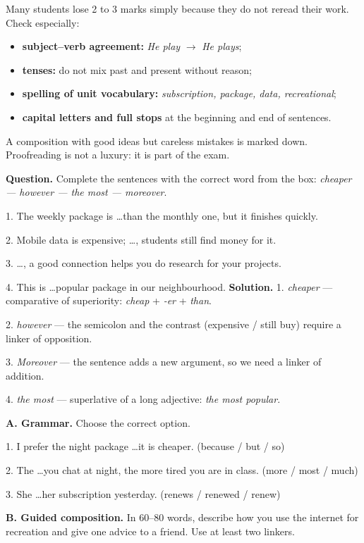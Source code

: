 \documentclass[11pt]{article}
\begin{document}
\begin{attention}
Many students lose 2 to 3 marks simply because they do not reread their work. Check especially:
\begin{itemize}
\item \textbf{subject--verb agreement:} \emph{He play} $\rightarrow$ \emph{He plays};
\item \textbf{tenses:} do not mix past and present without reason;
\item \textbf{spelling of unit vocabulary:} \emph{subscription, package, data, recreational};
\item \textbf{capital letters and full stops} at the beginning and end of sentences.
\end{itemize}
A composition with good ideas but careless mistakes is marked down. Proofreading is not a luxury: it is part of the exam.
\end{attention}

\begin{exoresolu}
\textbf{Question.} Complete the sentences with the correct word from the box: \emph{cheaper --- however --- the most --- moreover}.

1. The weekly package is \dots than the monthly one, but it finishes quickly.

2. Mobile data is expensive; \dots, students still find money for it.

3. \dots, a good connection helps you do research for your projects.

4. This is \dots popular package in our neighbourhood.
\tcblower
\textbf{Solution.}
1. \emph{cheaper} --- comparative of superiority: \emph{cheap} + \emph{-er} + \emph{than}.

2. \emph{however} --- the semicolon and the contrast (expensive / still buy) require a linker of opposition.

3. \emph{Moreover} --- the sentence adds a new argument, so we need a linker of addition.

4. \emph{the most} --- superlative of a long adjective: \emph{the most popular}.
\end{exoresolu}

\begin{exercice}
\textbf{A. Grammar.} Choose the correct option.

1. I prefer the night package \dots it is cheaper. (because / but / so)

2. The \dots you chat at night, the more tired you are in class. (more / most / much)

3. She \dots her subscription yesterday. (renews / renewed / renew)

\textbf{B. Guided composition.} In 60--80 words, describe how you use the internet for recreation and give one advice to a friend. Use at least two linkers.
\end{exercice}
\end{document}
